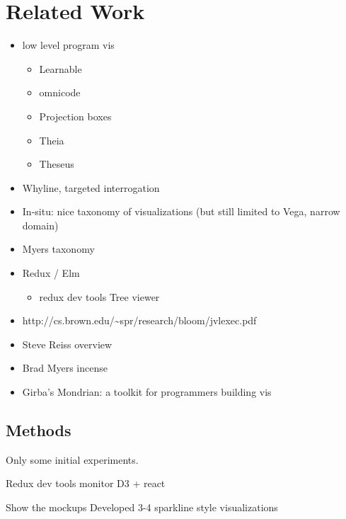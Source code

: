 \documentclass{sigchi}
\providecommand{\tightlist}{%
  \setlength{\itemsep}{0pt}\setlength{\parskip}{0pt}}
\begin{document}
\hypertarget{sec:related-work}{%
\section{Related Work}\label{sec:related-work}}

\begin{itemize}
\tightlist
\item
  low level program vis

  \begin{itemize}
  \tightlist
  \item
    Learnable \autocite{victora}
  \item
    omnicode \autocite{kang2017}
  \item
    Projection boxes \autocite{lerner2020}
  \item
    Theia \autocite{pollock2019}
  \item
    Theseus \autocite{lieber2014}
  \end{itemize}
\item
  Whyline, targeted interrogation \autocite{ko2004}
\item
  In-situ: nice taxonomy of visualizations (but still limited to Vega,
  narrow domain) \autocite{hoffswell2018a}
\item
  Myers taxonomy \autocite{myers1990}
\item
  Redux / Elm

  \begin{itemize}
  \tightlist
  \item
    redux dev tools Tree viewer
  \end{itemize}
\item
  http://cs.brown.edu/\textasciitilde spr/research/bloom/jvlexec.pdf
\item
  Steve Reiss overview
\item
  Brad Myers incense
\item
  Girba's Mondrian: a toolkit for programmers building vis
  \autocite{meyer2006}
\end{itemize}

\hypertarget{methods}{%
\subsection{Methods}\label{methods}}

Only some initial experiments.

Redux dev tools monitor D3 + react

Show the mockups Developed 3-4 sparkline style visualizations
\end{document}
